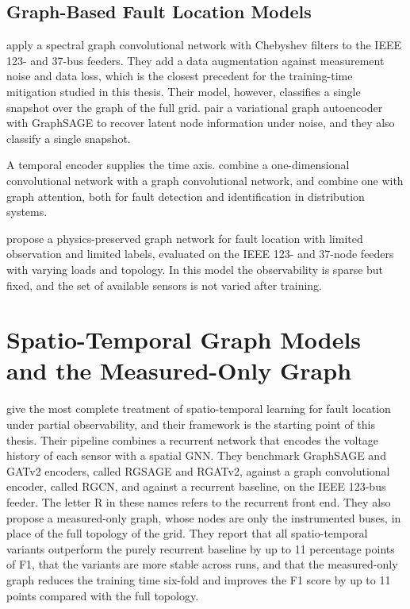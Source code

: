 \documentclass[MTech]{ugthesis}
\begin{document}
\subsection{Graph-Based Fault Location Models}

\citet{chen2020} apply a spectral graph convolutional network with Chebyshev filters to the IEEE 123- and 37-bus feeders. They add a data augmentation against measurement noise and data loss, which is the closest precedent for the training-time mitigation studied in this thesis. Their model, however, classifies a single snapshot over the graph of the full grid. \citet{fan2024} pair a variational graph autoencoder with GraphSAGE to recover latent node information under noise, and they also classify a single snapshot.

A temporal encoder supplies the time axis. \citet{nguyen2022} combine a one-dimensional convolutional network with a graph convolutional network, and \citet{ngo2025} combine one with graph attention, both for fault detection and identification in distribution systems.

\citet{li2021ppgn} propose a physics-preserved graph network for fault location with limited observation and limited labels, evaluated on the IEEE 123- and 37-node feeders with varying loads and topology. In this model the observability is sparse but fixed, and the set of available sensors is not varied after training.

\section{Spatio-Temporal Graph Models and the Measured-Only Graph}

\citet{karabulut2026} give the most complete treatment of spatio-temporal learning for fault location under partial observability, and their framework is the starting point of this thesis. Their pipeline combines a recurrent network that encodes the voltage history of each sensor with a spatial \ac{GNN}. They benchmark GraphSAGE and GATv2 encoders, called RGSAGE and RGATv2, against a graph convolutional encoder, called RGCN, and against a recurrent baseline, on the IEEE 123-bus feeder. The letter R in these names refers to the recurrent front end. They also propose a measured-only graph, whose nodes are only the instrumented buses, in place of the full topology of the grid. They report that all spatio-temporal variants outperform the purely recurrent baseline by up to 11 percentage points of F1, that the variants are more stable across runs, and that the measured-only graph reduces the training time six-fold and improves the F1 score by up to 11 points compared with the full topology.
\end{document}
